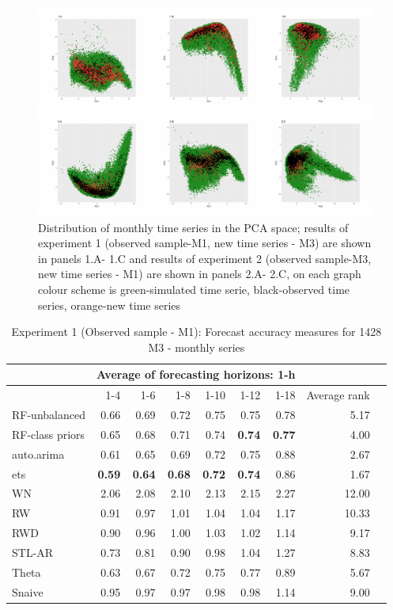 \documentclass[11pt,]{article}
\theoremstyle{definition}
\theoremstyle{definition}
\theoremstyle{definition}
\theoremstyle{remark}
\begin{document}
\begin{figure}

{\centering \includegraphics[width=\textwidth]{figure/pca3-1} 

}

\caption{Distribution of monthly time series in the PCA space; results of experiment 1 (observed sample-M1, new time series - M3) are shown in panels 1.A- 1.C and results of experiment 2 (observed sample-M3, new time series - M1) are shown in panels 2.A- 2.C, on each graph colour scheme is green-simulated time serie, black-observed time series, orange-new time series}\label{fig:pca3}
\end{figure}

\begin{table}[!h]
\centering
\caption{Experiment 1 (Observed sample - M1): Forecast accuracy measures for 1428 M3 - monthly series}
\label{M3M}
\begin{tabular}{lrrrrrrrr}
\hline
 & \multicolumn{6}{c}{Average of forecasting horizons: 1-h}    &  \\ \hline
 &  1-4& 1-6 & 1-8 & 1-10 & 1-12 & 1-18  & Average rank  \\ \hline
RF-unbalanced&  0.66& 0.69 & 0.72 & 0.75 & 0.75 & 0.78 & 5.17  \\ 
RF-class priors &  0.65& 0.68 & 0.71 & 0.74 & \bf{0.74} & \bf{0.77}  & 4.00  \\ auto.arima & 0.61 & 0.65 & 0.69 & 0.72 & 0.75 & 0.88 &  2.67   \\  
ets & \bf{0.59}  & \bf{0.64} & \bf{0.68} & \bf{0.72} & \bf{0.74} & 0.86 & 1.67   \\  
WN & 2.06 & 2.08 & 2.10 & 2.13 & 2.15 & 2.27 & 12.00   \\  
RW &0.91  &0.97  & 1.01 & 1.04 & 1.04 & 1.17 & 10.33  \\ 
RWD &0.90  & 0.96 &1.00  &1.03  & 1.02 & 1.14 & 9.17  \\ 
STL-AR & 0.73 & 0.81 & 0.90 & 0.98 & 1.04 & 1.27 & 8.83  \\ 
Theta & 0.63 & 0.67 & 0.72 & 0.75 & 0.77 & 0.89 & 5.67    \\ 
Snaive& 0.95 & 0.97 & 0.97 & 0.98 & 0.98 &  1.14& 9.00  \\ \hline
\end{tabular}
\end{table}\newpage
\end{document}
